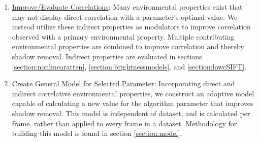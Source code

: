\documentclass[12pt]{report}
\begin{document}
\begin{enumerate}
\item \underline{Improve/Evaluate Correlations}: Many environmental properties exist that may not display direct correlation with a parameter's optimal value. We instead utilize these indirect properties as modulators to improve correlation observed with a primary environmental property. Multiple contributing environmental properties are combined to improve correlation and thereby shadow removal. Indirect properties are evaluated in sections \ref{section:nonlinearatten}, \ref{section:brightnessmodels}, and \ref{section:lowcSIFT}.

\item \underline{Create General Model for Selected Parameter}: Incorporating direct and indirect correlative environmental properties, we construct an adaptive model capable of calculating a new value for the algorithm parameter that improves shadow removal. This model is independent of dataset, and is calculated per frame, rather than applied to every frame in a dataset. Methodology for building this model is found in section \ref{section:model}.
\end{enumerate}
\end{document}
